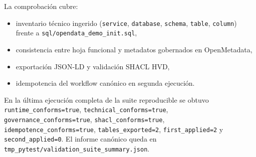 La comprobación cubre:
\begin{itemize}
  \item inventario técnico ingerido (\texttt{service}, \texttt{database}, \texttt{schema}, \texttt{table}, \texttt{column}) frente a \texttt{sql/opendata\_demo\_init.sql},
  \item consistencia entre hoja funcional y metadatos gobernados en OpenMetadata,
  \item exportación JSON-LD y validación SHACL HVD,
  \item idempotencia del workflow canónico en segunda ejecución.
\end{itemize}

En la última ejecución completa de la suite reproducible se obtuvo \texttt{runtime\_conforms=true}, \texttt{technical\_conforms=true}, \texttt{governance\_conforms=true}, \texttt{shacl\_conforms=true}, \texttt{idempotence\_conforms=true}, \texttt{tables\_exported=2}, \texttt{first\_applied=2} y \texttt{second\_applied=0}. El informe canónico queda en \texttt{tmp\_pytest/validation\_suite\_summary.json}.
